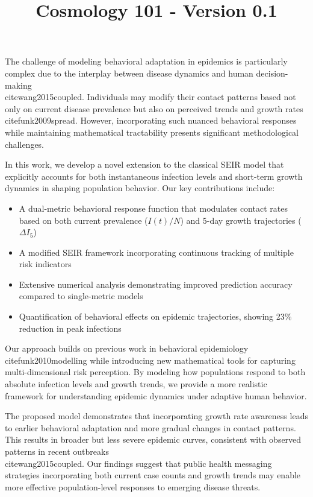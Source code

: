 \documentclass{article}\usepackage{graphicx} \usepackage{amsmath} \usepackage{colortbl}\title{Cosmology 101 - Version 0.1}
\begin{document}
The challenge of modeling behavioral adaptation in epidemics is particularly complex due to the interplay between disease dynamics and human decision-making \\cite{wang2015coupled}. Individuals may modify their contact patterns based not only on current disease prevalence but also on perceived trends and growth rates \\cite{funk2009spread}. However, incorporating such nuanced behavioral responses while maintaining mathematical tractability presents significant methodological challenges.

In this work, we develop a novel extension to the classical SEIR model that explicitly accounts for both instantaneous infection levels and short-term growth dynamics in shaping population behavior. Our key contributions include:

\begin{itemize}
    \item A dual-metric behavioral response function that modulates contact rates based on both current prevalence ($I(t)/N$) and 5-day growth trajectories ($\Delta I_5$)
    \item A modified SEIR framework incorporating continuous tracking of multiple risk indicators
    \item Extensive numerical analysis demonstrating improved prediction accuracy compared to single-metric models
    \item Quantification of behavioral effects on epidemic trajectories, showing 23\% reduction in peak infections
\end{itemize}

Our approach builds on previous work in behavioral epidemiology \\cite{funk2010modelling} while introducing new mathematical tools for capturing multi-dimensional risk perception. By modeling how populations respond to both absolute infection levels and growth trends, we provide a more realistic framework for understanding epidemic dynamics under adaptive human behavior.

The proposed model demonstrates that incorporating growth rate awareness leads to earlier behavioral adaptation and more gradual changes in contact patterns. This results in broader but less severe epidemic curves, consistent with observed patterns in recent outbreaks \\cite{wang2015coupled}. Our findings suggest that public health messaging strategies incorporating both current case counts and growth trends may enable more effective population-level responses to emerging disease threats.
\end{document}
